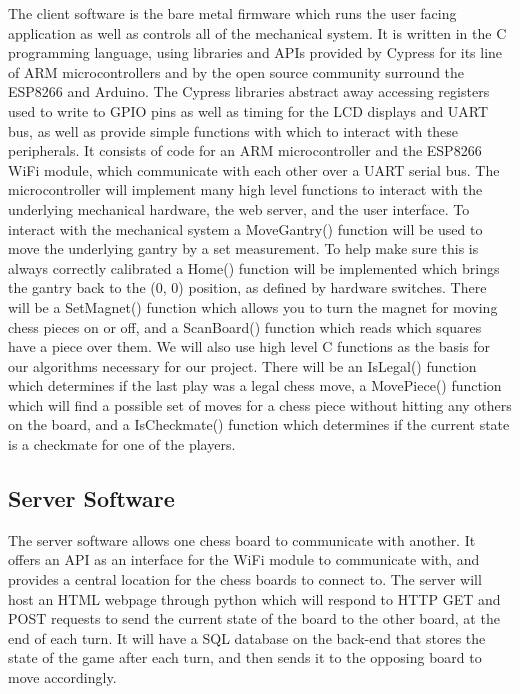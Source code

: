 \documentclass{article}
\begin{document}
The client software is the bare metal firmware which runs the user facing application as well as controls all of the mechanical system. It is written in the C programming language, using libraries and APIs provided by Cypress for its line of ARM microcontrollers and by the open source community surround the ESP8266 and Arduino. The Cypress libraries abstract away accessing registers used to write to GPIO pins as well as timing for the LCD displays and UART bus, as well as provide simple functions with which to interact with these peripherals. It consists of code for an ARM microcontroller and the ESP8266 WiFi module, which communicate with each other over a UART serial bus. The microcontroller will implement many high level functions to interact with the underlying mechanical hardware, the web server, and the user interface. To interact with the mechanical system a MoveGantry() function will be used to move the underlying gantry by a set measurement. To help make sure this is always correctly calibrated a Home() function will be implemented which brings the gantry back to the (0, 0) position, as defined by hardware switches. There will be a SetMagnet() function which allows you to turn the magnet for moving chess pieces on or off, and a ScanBoard() function which reads which squares have a piece over them. We will also use high level C functions as the basis for our algorithms necessary for our project. There will be an IsLegal() function which determines if the last play was a legal chess move, a MovePiece() function which will find a possible set of moves for a chess piece without hitting any others on the board, and a IsCheckmate() function which determines if the current state is a checkmate for one of the players.

\subsection*{Server Software}
\indent

The server software allows one chess board to communicate with another. It offers an API as an interface for the WiFi module to communicate with, and provides a central location for the chess boards to connect to. The server will host an HTML webpage through python which will respond to HTTP GET and POST requests to send the current state of the board to the other board, at the end of each turn. It will have a SQL database on the back-end that stores the state of the game after each turn, and then sends it to the opposing board to move accordingly.
\end{document}
